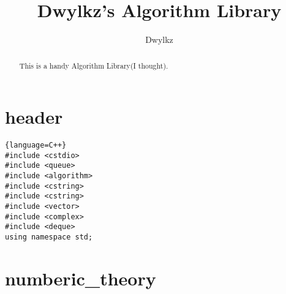 



\title{Dwylkz's Algorithm Library}
\author{Dwylkz}
\maketitle

\begin{abstract}
  This is a handy Algorithm Library(I thought).
\end{abstract}

\tableofcontents
\newpage
{}
\def\cpp#1#{\begin{lstlisting}{language=C++}#1\end{lstlisting}}

\section{header}
\begin{lstlisting}{language=C++}
#include <cstdio>
#include <queue>
#include <algorithm>
#include <cstring>
#include <cstring>
#include <vector>
#include <complex>
#include <deque>
using namespace std;
\end{lstlisting}
\newpage

\section{numberic\_theory}
\newpage



